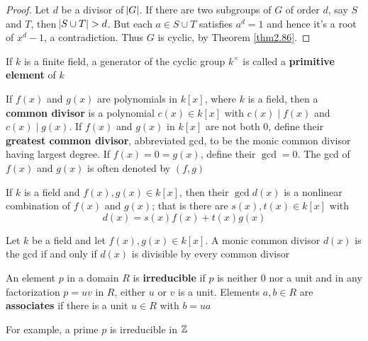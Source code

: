 \documentclass[11pt]{article}
\begin{document}
\begin{proof}
Let \(d\) be a divisor of \(\abs{G}\). If there are two subgroups of \(G\) of order
\(d\), say \(S\) and \(T\), then \(\abs{S\cup T}>d\). But each \(a\in S\cup T\)
satisfies \(a^d=1\) and hence it's a root of \(x^d-1\), a contradiction. Thus \(G\)
is cyclic, by Theorem \ref{thm2.86}.
\end{proof}

\begin{definition}[]
If \(k\) is a finite field, a generator of the cyclic group \(k^\times\) is
called a \textbf{primitive element} of \(k\)
\end{definition}

\begin{definition}[]
If \(f(x)\) and \(g(x)\) are polynomials in \(k[x]\), where \(k\) is a field, then a
\textbf{common divisor} is a polynomial \(c(x)\in k[x]\) with \(c(x)\mid f(x)\) and
\(c(x)\mid g(x)\). If \(f(x)\) and \(g(x)\) in \(k[x]\) are not both 0, define their
\textbf{greatest common divisor}, abbreviated gcd, to be the monic common divisor
having largest degree. If \(f(x)=0=g(x)\), define their \(\gcd=0\). The gcd of
\(f(x)\) and \(g(x)\) is often denoted by \((f,g)\)
\end{definition}

\begin{theorem}[]
If \(k\) is a field and \(f(x),g(x)\in k[x]\), then their \(\gcd d(x)\) is a
nonlinear combination of \(f(x)\) and \(g(x)\); that is there are \(s(x),t(x)\in
   k[x]\) with
\begin{equation*}
d(x)=s(x)f(x)+t(x)g(x)
\end{equation*}
\end{theorem}

\begin{corollary}[]
Let \(k\) be a field and let \(f(x),g(x)\in k[x]\). A monic common divisor
\(d(x)\) is the gcd if and only if \(d(x)\) is divisible by every common divisor
\end{corollary}

\begin{definition}[]
An element \(p\) in a domain \(R\) is \textbf{irreducible} if \(p\) is neither 0 nor a unit
and in any factorization \(p=uv\) in \(R\), either \(u\) or \(v\) is a unit. Elements
\(a,b\in R\) are \textbf{associates} if there is a unit \(u\in R\) with \(b=ua\)
\end{definition}

For example, a prime \(p\) is irreducible in \(\mathbb{Z}\)
\end{document}
